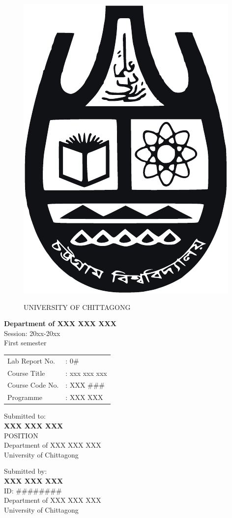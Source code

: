 \documentclass[a4paper, 12pt]{article}
\begin{document}
\begin{figure}[h]
		\vspace*{-4em}
		\centering
		\includegraphics[width=0.2\linewidth]{./graphics/logo.pdf}
		\par
		\vspace*{2em}
		{\Large UNIVERSITY OF CHITTAGONG}
\end{figure}

\begin{center}
		\vspace*{3em}
		\textbf{Department of XXX XXX XXX} \\
		\bigskip
		Session: 20xx-20xx \\
		First semester \\
		\bigskip
		\begin{tabular}{l l}
		  Lab Report No. &: 0\#\\
		  Course Title &: xxx xxx xxx \\
		  Course Code No. &: XXX \#\#\# \\
		  Programme &: XXX XXX
		\end{tabular}
\end{center}

\begin{center}
		\vspace*{3em}
		Submitted to: \\
		\textbf{XXX XXX XXX} \\
		POSITION \\
		Department of XXX XXX XXX \\
		University of Chittagong
\end{center}

\begin{center}
		\vspace*{3em}
		Submitted by: \\
		\textbf{XXX XXX XXX} \\
		ID: \#\#\#\#\#\#\#\# \\
		Department of XXX XXX XXX \\
		University of Chittagong
\end{center}
\end{document}

